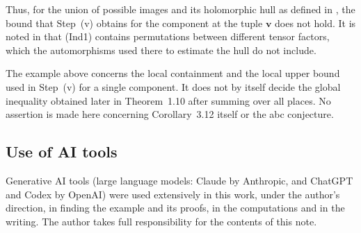 \documentclass[11pt]{amsart}
\theoremstyle{remark}
\newcommand{\bv}{\mathbf v}
\begin{document}
Thus, for the union of possible images and its holomorphic hull as defined in \cite[Cor.~3.12]{IUT3}, the bound that
Step~(v) obtains for the component at the tuple $\bv$ does not hold. It is noted in \cite[\S6.2, footnote~7]{DH} that
(Ind1) contains permutations between different tensor factors, which the automorphisms used there to estimate the
hull do not include.

The example above concerns the local containment and the local upper bound used in Step~(v) for a single
component. It does not by itself decide the global
inequality obtained later in Theorem~1.10 after summing over all places. No assertion is made here concerning
Corollary~3.12 itself or the abc conjecture.

\subsection*{Use of AI tools}
Generative AI tools (large language models: \mbox{Claude} by \mbox{Anthropic}, and \mbox{ChatGPT} and \mbox{Codex} by \mbox{OpenAI}) were used
extensively in this work, under the author's direction, in
finding the example and its proofs, in the computations and in the writing. The author takes full responsibility for
the contents of this note.
\end{document}
